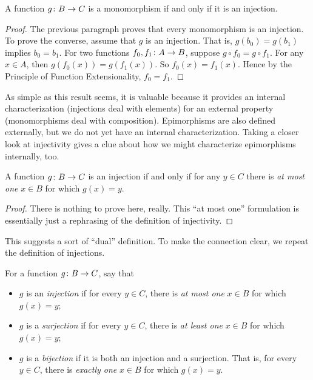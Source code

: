 \begin{lemma}
	A function ${g}\colon{B}\to{C}$ is a monomorphism if and only if it is an injection.
	\begin{proof}
		The previous paragraph proves that every monomorphism is an injection. To prove the converse, assume that $g$ is an injection. 
		That is, $g(b_0)=g(b_1)$ implies $b_0=b_1$.
		For two functions ${f_0,f_1}\colon{A}\to{B}$, suppose $g\circ f_0=g\circ f_1$. 
		For any $x\in A$, then $g(f_0(x)) = g(f_1(x))$. So $f_0(x)=f_1(x)$. Hence by the Principle of Function Extensionality, $f_0=f_1$.
	\end{proof}
\end{lemma}

As simple as this result seems, it is valuable because it provides an internal characterization (injections deal with elements) for an external property (monomorphisms deal with composition). 
Epimorphisms are also defined externally, but we do not yet have an internal characterization. 
Taking a closer look at injectivity gives a clue about how we might characterize epimorphisms internally, too.

\begin{lemma}
	A function ${g}\colon{B}\to{C}$ is an injection if and only if for any $y\in C$ there is \emph{at most one} $x\in B$ for which $g(x)=y$.
	
	\begin{proof}
There is nothing to prove here, really. This ``at most one'' formulation is essentially just a rephrasing of the definition of injectivity.
	\end{proof}
\end{lemma}

This suggests a sort of ``dual'' definition. To make the connection clear, we repeat the definition of injections.

\begin{defn}
	For a function ${g}\colon{B}\to{C}$, say that
	\begin{itemize}
		\item $g$ is an \emph{injection} if for every $y\in C$, there is \emph{at most one} $x\in B$ for which $g(x)=y$;
		\item $g$ is a \emph{surjection} if for every $y\in C$, there is \emph{at least one} $x\in B$ for which $g(x)=y$;
		\item $g$ is a \emph{bijection} if it is both an injection and a surjection. That is, for every $y\in C$, there is \emph{exactly one} $x\in B$ for which $g(x)=y$. 
	\end{itemize}  
\end{defn}

